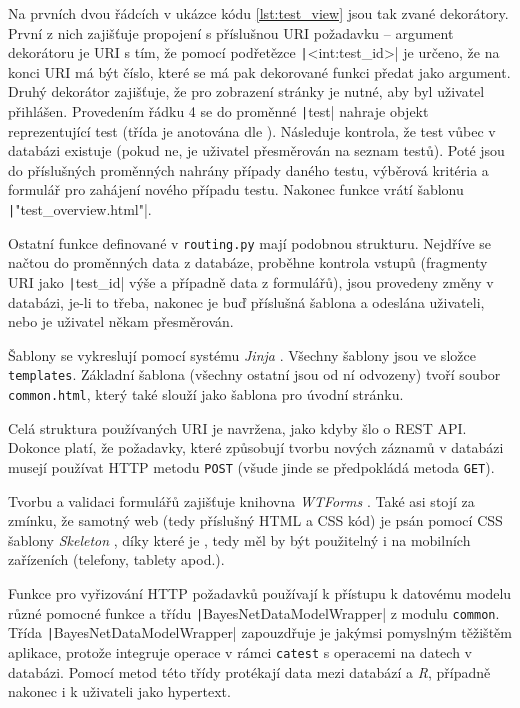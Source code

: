 \documentclass[a4paper,twoside,12pt]{scrbook}
\begin{document}
Na prvních dvou řádcích v ukázce kódu \ref{lst:test_view} jsou tak zvané dekorátory. První z nich zajišťuje propojení s příslušnou URI požadavku -- argument dekorátoru je URI s tím, že pomocí podřetězce \texttt|<int:test_id>| je určeno, že na konci URI má být číslo, které se má pak dekorované funkci předat jako argument. Druhý dekorátor zajišťuje, že pro zobrazení stránky je nutné, aby byl uživatel přihlášen. Provedením řádku 4 se do proměnné \texttt|test| nahraje objekt reprezentující test (třída je anotována dle \cite{PEP484}). Následuje kontrola, že test vůbec v databázi existuje (pokud ne, je uživatel přesměrován na seznam testů). Poté jsou do příslušných proměnných nahrány případy daného testu, výběrová kritéria a formulář pro zahájení nového případu testu. Nakonec funkce vrátí  šablonu \texttt|"test_overview.html"|.

Ostatní funkce definované v \texttt{routing.py} mají podobnou strukturu. Nejdříve se načtou do proměnných data z databáze, proběhne kontrola vstupů (fragmenty URI jako \texttt|test_id| výše a případně data z formulářů), jsou provedeny změny v databázi, je-li to třeba, nakonec je buď  příslušná šablona a odeslána uživateli, nebo je uživatel někam přesměrován.

Šablony se vykreslují pomocí systému \textit{Jinja} \cite{jinja2}. Všechny šablony jsou ve složce \texttt{templates}. Základní šablona (všechny ostatní jsou od ní odvozeny) tvoří soubor \texttt{common.html}, který také slouží jako šablona pro úvodní stránku.

Celá struktura používaných URI je navržena, jako kdyby šlo o REST API. Dokonce platí, že požadavky, které způsobují tvorbu nových záznamů v databázi musejí používat HTTP metodu \texttt{POST} (všude jinde se předpokládá metoda \texttt{GET}).

Tvorbu a validaci formulářů zajišťuje knihovna \textit{WTForms} \cite{wtforms}. Také asi stojí za zmínku, že samotný web (tedy příslušný HTML a CSS kód) je psán pomocí CSS šablony \textit{Skeleton} \cite{skeleton.css}, díky které je , tedy měl by být použitelný i na mobilních zařízeních (telefony, tablety apod.).

Funkce pro vyřizování HTTP požadavků používají k přístupu k datovému modelu různé pomocné funkce a třídu \texttt|BayesNetDataModelWrapper| z modulu \texttt{common}. Třída \texttt|BayesNetDataModelWrapper| zapouzdřuje je jakýmsi pomyslným těžištěm aplikace, protože integruje operace v rámci \texttt{catest} s operacemi na datech v databázi. Pomocí metod této třídy protékají data mezi databází a \textit{R}, případně nakonec i k uživateli jako hypertext.
\end{document}
